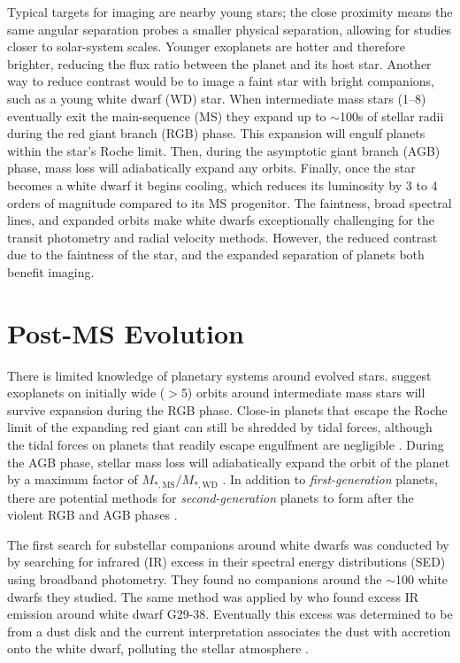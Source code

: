 \documentclass[twocolumn]{aastex631}
\begin{document}
Typical targets for imaging are nearby young stars; the close proximity means the same angular separation probes a smaller physical separation, allowing for studies closer to solar-system scales. Younger exoplanets are hotter and therefore brighter, reducing the flux ratio between the planet and its host star. Another way to reduce contrast would be to image a faint star with bright companions, such as a young white dwarf (WD) star. When intermediate mass stars (\qtyrange{1}{8}{\solarmass}) eventually exit the main-sequence (MS) they expand up to $\sim$100s of stellar radii during the red giant branch (RGB) phase. This expansion will engulf planets within the star's Roche limit. Then, during the asymptotic giant branch (AGB) phase, mass loss will adiabatically expand any orbits. Finally, once the star becomes a white dwarf it begins cooling, which reduces its luminosity by 3 to 4 orders of magnitude compared to its MS progenitor. The faintness, broad spectral lines, and expanded orbits make white dwarfs exceptionally challenging for the transit photometry and radial velocity methods. However, the reduced contrast due to the faintness of the star, and the expanded separation of planets both benefit imaging.

\section{Post-MS Evolution}

There is limited knowledge of planetary systems around evolved stars. \citet{burleigh_imaging_2002,veras_post-main-sequence_2016} suggest exoplanets on initially wide ($>$\qty{5}{\au}) orbits around intermediate mass stars will survive expansion during the RGB phase. Close-in planets that escape the Roche limit of the expanding red giant can still be shredded by tidal forces, although the tidal forces on planets that readily escape engulfment are negligible \citep{nordhaus_orbits_2013}. During the AGB phase, stellar mass loss will adiabatically expand the orbit of the planet by a maximum factor of $M_{*,\mathrm{MS}}/M_{*,\mathrm{WD}}$ \citep{jeans_cosmogonic_1924}. In addition to \textit{first-generation} planets, there are potential methods for \textit{second-generation} planets to form after the violent RGB and AGB phases \citep{perets_second_2010}.

The first search for substellar companions around white dwarfs was conducted by \citet{probst_infrared_1983} by searching for infrared (IR) excess in their spectral energy distributions (SED) using broadband photometry. They found no companions around the $\sim$100 white dwarfs they studied. The same method was applied by \citet{zuckerman_excess_1987} who found excess IR emission around white dwarf G29-38. Eventually this excess was determined to be from a dust disk \citep{telesco_observations_1990} and the current interpretation associates the dust with accretion onto the white dwarf, polluting the stellar atmosphere \citep{koester_metals_1997}.
\end{document}
